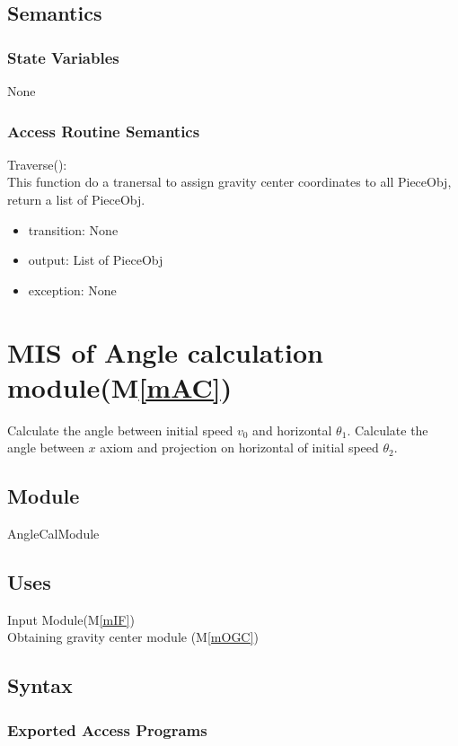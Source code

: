 \documentclass[12pt, titlepage]{article}
\newcommand{\mref}[1]{M\ref{#1}}
\begin{document}
\subsection{Semantics}

\subsubsection{State Variables}
None
\subsubsection{Access Routine Semantics}

\noindent Traverse():\\
This function do a tranersal to assign gravity center coordinates to all PieceObj, return a list of PieceObj.
\begin{itemize}
	\item transition: None
	\item output: List of PieceObj 
	\item exception: None
\end{itemize}

\section{MIS of Angle calculation module(\mref{mAC})} 
Calculate the angle between initial speed $v_{0}$ and horizontal $\theta_{1}$. Calculate the angle between $x$ axiom and projection on horizontal of initial speed $\theta_{2}$. 
\subsection{Module}

AngleCalModule

\subsection{Uses}

Input Module(\mref{mIF})\\
Obtaining gravity center module (\mref{mOGC})

\subsection{Syntax}

\subsubsection{Exported Access Programs}
\end{document}
